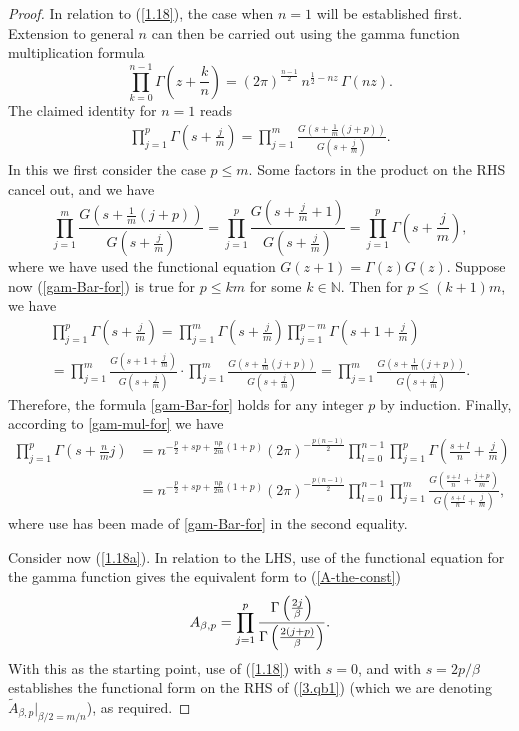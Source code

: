 \documentclass[10pt,a4paper]{amsart}
\begin{document}
\begin{proof}
In relation to (\ref{1.18}),
 the case when $n=1$ will be established first. Extension to general $n$ can then be carried out using the gamma function multiplication formula
\begin{equation}\label{gam-mul-for}
    \prod_{k=0}^{n-1} \Gamma\!\left(z + \frac{k}{n}\right) = (2\pi)^{\frac{n-1}{2}} \, n^{\frac{1}{2} - nz} \, \Gamma(nz).
\end{equation}
The claimed identity for $n=1$ reads
\begin{align}\label{gam-Bar-for}
    \prod_{j=1}^p \Gamma\left(s+\frac{j}{m} \right)=\prod_{j=1}^{m} \frac{G\left(s+\frac{1}{m}(j+p)\right)}{G\left(s+\frac{j}{m} \right)}.
\end{align}
    In this we first consider the case $p \leqslant m$. Some factors in the product on the RHS cancel out, and we have
$$
\prod_{j=1}^{m} \frac{G\left(s+\frac{1}{m}(j+p)\right)}{G\left(s+\frac{j}{m} \right)}=\prod_{j=1}^p \frac{G\left(s+\frac{j}{m} +1\right)}{G\left(s+\frac{j}{m}\right)}=\prod_{j=1}^p \Gamma\left(s+\frac{j}{m}\right),
$$
where we have used the functional equation $G(z+1)=\Gamma(z) G(z)$. Suppose now 
(\ref{gam-Bar-for}) 
is true for $p \leqslant km$ for some $k \in \mathbb{N}$. Then for $p \leqslant (k+1)m$, we have
\begin{multline*}
\prod_{j=1}^p \Gamma\left(s+\frac{j}{m}\right)=\prod_{j=1}^{m} \Gamma\left(s+\frac{j}{m}\right) \prod_{j=1}^{p-m} \Gamma\left(s+1+\frac{j}{m}\right) \\
=\prod_{j=1}^{m} \frac{G\left(s+1+\frac{j}{m}\right)}{G\left(s+\frac{j}{m}\right)} \cdot \prod_{j=1}^{m} \frac{G\left(s+\frac{1}{m}(j+p)\right)}{G\left(s+\frac{j}{m}\right)} 
=\prod_{j=1}^{m} \frac{G\left(s+\frac{1}{m}(j+p)\right)}{G\left(s+\frac{j}{m}\right)} .
\end{multline*}
Therefore, the formula \eqref{gam-Bar-for} holds for any integer $p$ by induction. Finally, according to \eqref{gam-mul-for} we have
\begin{align*}
    \prod_{j=1}^{p}\Gamma\left(s+\frac{n}{m}j\right)&=n^{-\frac{p}{2}+sp+\frac{np}{2m}(1+p)}(2\pi)^{-\frac{p(n-1)}{2}}\prod_{l=0}^{n-1}\prod_{j=1}^{p}\Gamma\left(\frac{s+l}{n}+\frac{j}{m}\right)\\
    &=n^{-\frac{p}{2}+sp+\frac{np}{2m}(1+p)}(2\pi)^{-\frac{p(n-1)}{2}}\prod_{l=0}^{n-1}\prod_{j=1}^{m}\frac{G\left(\frac{s+l}{n}+\frac{j+p}{m}\right)}{G\left(\frac{s+l}{n}+\frac{j}{m}\right)},
\end{align*}
where use has been made of \eqref{gam-Bar-for} in the second equality.

Consider now (\ref{1.18a}). In relation to the LHS, use of the functional equation for the gamma function gives the equivalent form to (\ref{A-the-const})
$$
A_{\beta,p} = \prod_{j=1}^p 
{\Gamma\left({2j\over\beta}\right)\over\Gamma\left({2(j+p)\over\beta}\right)}.
$$
With this as the starting point, use of (\ref{1.18}) with $s=0$, and with $s=2p/\beta$
establishes the functional form on the RHS of (\ref{3.qb1}) (which we
are denoting $\tilde{A}_{\beta,p} |_{\beta/2=m/n}$), as required.
\end{proof}
\end{document}
